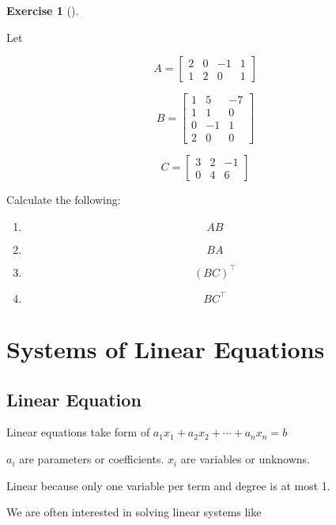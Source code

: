 \documentclass[
  letterpaper,
]{book}
\providecommand{\tightlist}{%
  \setlength{\itemsep}{0pt}\setlength{\parskip}{0pt}}\usepackage{longtable,booktabs,array}
\theoremstyle{definition}
\theoremstyle{definition}
\theoremstyle{plain}
\theoremstyle{definition}
\newtheorem{exercise}{Exercise}[chapter]
\theoremstyle{plain}
\theoremstyle{plain}
\theoremstyle{remark}
\begin{document}
\leavevmode{}%
\begin{exercise}[]\label{exr-matrixmulti1}

Let

\[A =  \begin{bmatrix} 2&0&-1&1\\1&2&0&1 \end{bmatrix}\]

\[B = \begin{bmatrix} 1&5&-7\\1&1&0\\0&-1&1\\2&0&0\end{bmatrix}\]

\[C =  \begin{bmatrix} 3&2&-1\\0&4&6 \end{bmatrix}\]

Calculate the following:

\begin{enumerate}
\def\labelenumi{\arabic{enumi}.}
\tightlist
\item
  \[AB\]
\item
  \[BA\]
\item
  \[(BC)^\top\]
\item
  \[BC^\top\]
\end{enumerate}

\end{exercise}

\hypertarget{systems-of-linear-equations}{%
\section{Systems of Linear
Equations}\label{systems-of-linear-equations}}

\hypertarget{linear-equation}{%
\subsection{Linear Equation}\label{linear-equation}}

Linear equations take form of
\(a_1 x_1 + a_2 x_2 + \cdots + a_n x_n = b\)

\(a_i\) are parameters or coefficients. \(x_i\) are variables or
unknowns.

Linear because only one variable per term and degree is at most 1.

We are often interested in solving linear systems like
\end{document}
